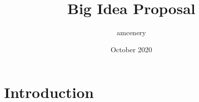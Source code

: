 \documentclass{article}
\title{Big Idea Proposal}
\author{amcenery }
\date{October 2020}
\begin{document}
\maketitle

\section{Introduction}
\end{document}
